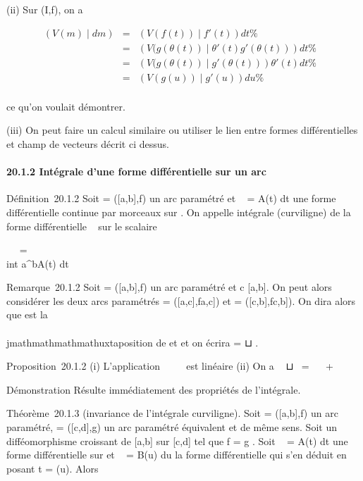 (ii) Sur (I,f), on a

\begin{align*} (V
(m)∣dm)& =& \left (V
(f(t))∣f'(t)\right ) dt \%&
\\ & =& \left (V
(g(\theta(t))∣\theta'(t)g'(\theta(t))\right )
dt\%& \\ & =& \left (V
(g(\theta(t))∣g'(\theta(t))\right )\theta'(t)
dt\%& \\ & =& \left (V
(g(u))∣g'(u)\right ) du \%&
\\ \end{align*}

ce qu'on voulait démontrer.

(iii) On peut faire un calcul similaire ou utiliser le lien entre formes
différentielles et champ de vecteurs décrit ci dessus.

\paragraph{20.1.2 Intégrale d'une forme différentielle sur un arc}

Définition~20.1.2 Soit \Gamma = ({[}a,b{]},f) un arc paramétré et \alpha~ = A(t) dt
une forme différentielle continue par morceaux sur \Gamma. On appelle
intégrale (curviligne) de la forme différentielle \alpha~ sur \Gamma le scalaire

\int  \Gamma~\alpha~ =\\int
 a^bA(t) dt

Remarque~20.1.2 Soit \Gamma = ({[}a,b{]},f) un arc paramétré et c \in
{[}a,b{]}. On peut alors considérer les deux arcs paramétrés
 = ({[}a,c{]},f\textbar{}{[}a,c{]}) et
 = ({[}c,b{]},f\textbar{}{[}c,b{]}). On
dira alors que \Gamma est la \\\\jmathmathmathmathuxtaposition de  et  et
on écrira \Gamma =  ⊔ .

Proposition~20.1.2 (i) L'application
\alpha~\mapsto~\int  \Gamma~\alpha~
est linéaire (ii) On a \int ~
⊔\alpha~ =\int ~
\alpha~ +\int ~
\alpha~

Démonstration Résulte immédiatement des propriétés de l'intégrale.

Théorème~20.1.3 (invariance de l'intégrale curviligne). Soit
 = ({[}a,b{]},f) un arc paramétré,  =
({[}c,d{]},g) un arc paramétré équivalent et de même sens. Soit \theta un
difféomorphisme croissant de {[}a,b{]} sur {[}c,d{]} tel que f = g \cdot \theta.
Soit \alpha~ = A(t) dt une forme différentielle sur  et \beta~ = B(u)
du la forme différentielle qui s'en déduit en posant t = \theta(u). Alors

